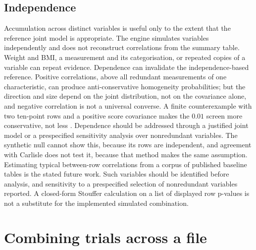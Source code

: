 \documentclass[11pt,a4paper]{article}
\begin{document}
\subsection{Independence}

Accumulation across distinct variables is useful only to the extent that the reference joint model is appropriate. The engine simulates variables independently and does not reconstruct correlations from the summary table. Weight and BMI, a measurement and its categorisation, or repeated copies of a variable can repeat evidence. Dependence can invalidate the independence-based reference. Positive correlations, above all redundant measurements of one characteristic, can produce anti-conservative homogeneity probabilities; but the direction and size depend on the joint distribution, not on the covariance alone, and negative correlation is not a universal converse. A finite counterexample with two ten-point rows and a positive score covariance makes the $0.01$ screen more conservative, not less \citep{paperaudit2026}. Dependence should be addressed through a justified joint model or a prespecified sensitivity analysis over nonredundant variables. The synthetic null cannot show this, because its rows are independent, and agreement with Carlisle does not test it, because that method makes the same assumption. Estimating typical between-row correlations from a corpus of published baseline tables is the stated future work. Such variables should be identified before analysis, and sensitivity to a prespecified selection of nonredundant variables reported. A closed-form Stouffer calculation on a list of displayed row p-values is not a substitute for the implemented simulated combination.

\section{Combining trials across a file}
\label{sec:overall}
\end{document}
